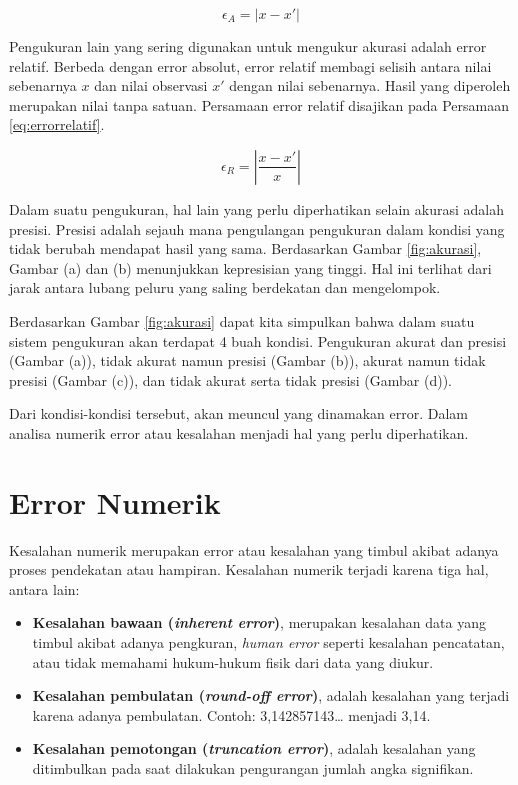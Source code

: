 \documentclass[]{book}
\theoremstyle{definition}
\theoremstyle{definition}
\theoremstyle{definition}
\theoremstyle{remark}
\begin{document}
\begin{equation}
   \epsilon_A=\left|x-x'\right|
  \label{eq:errorabsolut}
\end{equation}

Pengukuran lain yang sering digunakan untuk mengukur akurasi adalah error relatif. Berbeda dengan error absolut, error relatif membagi selisih antara nilai sebenarnya \(x\) dan nilai observasi \(x'\) dengan nilai sebenarnya. Hasil yang diperoleh merupakan nilai tanpa satuan. Persamaan error relatif disajikan pada Persamaan \eqref{eq:errorrelatif}.

\begin{equation}
   \epsilon_R=\left|\frac{x-x'}{x}\right|
  \label{eq:errorrelatif}
\end{equation}

Dalam suatu pengukuran, hal lain yang perlu diperhatikan selain akurasi adalah presisi. Presisi adalah sejauh mana pengulangan pengukuran dalam kondisi yang tidak berubah mendapat hasil yang sama. Berdasarkan Gambar \ref{fig:akurasi}, Gambar (a) dan (b) menunjukkan kepresisian yang tinggi. Hal ini terlihat dari jarak antara lubang peluru yang saling berdekatan dan mengelompok.

Berdasarkan Gambar \ref{fig:akurasi} dapat kita simpulkan bahwa dalam suatu sistem pengukuran akan terdapat 4 buah kondisi. Pengukuran akurat dan presisi (Gambar (a)), tidak akurat namun presisi (Gambar (b)), akurat namun tidak presisi (Gambar (c)), dan tidak akurat serta tidak presisi (Gambar (d)).

Dari kondisi-kondisi tersebut, akan meuncul yang dinamakan error. Dalam analisa numerik error atau kesalahan menjadi hal yang perlu diperhatikan.

\hypertarget{numerror}{%
\section{Error Numerik}\label{numerror}}

Kesalahan numerik merupakan error atau kesalahan yang timbul akibat adanya proses pendekatan atau hampiran. Kesalahan numerik terjadi karena tiga hal, antara lain:

\begin{itemize}
\item
  \textbf{Kesalahan bawaan (\emph{inherent error})}, merupakan kesalahan data yang timbul akibat adanya pengkuran, \emph{human error} seperti kesalahan pencatatan, atau tidak memahami hukum-hukum fisik dari data yang diukur.
\item
  \textbf{Kesalahan pembulatan (\emph{round-off error})}, adalah kesalahan yang terjadi karena adanya pembulatan. Contoh: 3,142857143\ldots{} menjadi 3,14.
\item
  \textbf{Kesalahan pemotongan (\emph{truncation error})}, adalah kesalahan yang ditimbulkan pada saat dilakukan pengurangan jumlah angka signifikan.
\end{itemize}
\end{document}
